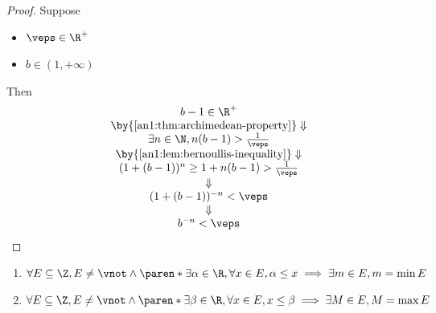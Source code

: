 \begin{proof}
  Suppose
  \begin{itemize}
    \item $\veps \in \R^{+}$
    \item $b \in (1, + \infty)$
  \end{itemize}
  Then
  \[
    \begin{array}{c}
      b - 1 \in \R^{+}                                      \\
      \by{\Cref{an1:thm:archimedean-property}} \Downarrow   \\
      \exists n \in \N, n(b - 1) > \frac{1}{\veps}          \\
      \by{\Cref{an1:lem:bernoullis-inequality}} \Downarrow  \\
      (1 + (b - 1))^{n} \geq 1 + n(b - 1) > \frac{1}{\veps} \\
      \Downarrow                                            \\
      (1 + (b - 1))^{-n} < \veps                            \\
      \Downarrow                                            \\
      b^{-n} < \veps
    \end{array}
  \]
\end{proof}

\begin{theorem} \label{an1:thm:bounded-subset-of-Z-in-R-has-extremum}
  \leavevmode\par
  \begin{enumerate}[label=\textbf{(\Alph*)}]
    \item $\forall E \subseteq \Z, E \neq \vnot \land \paren*{\exists \alpha \in \R,
              \forall x \in E, \alpha \leq x} \implies \exists m \in E, m = \min E$
    \item $\forall E \subseteq \Z, E \neq \vnot \land \paren*{\exists \beta \in \R,
              \forall x \in E, x \leq \beta} \implies \exists M \in E, M = \max E$
  \end{enumerate}
\end{theorem}

